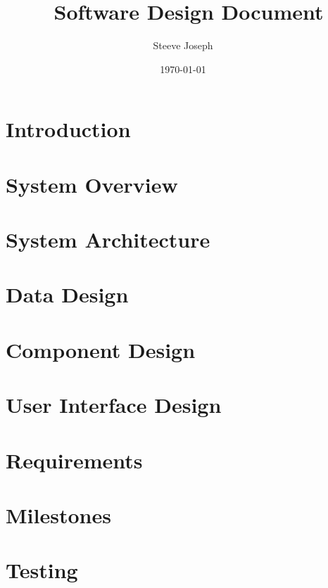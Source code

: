 \documentclass[twoside]{report}
\title{\serviceName\ Software Design Document}
\author{Steeve Joseph}
\date{\today}
\begin{document}
\maketitle
\tableofcontents
\listoffigures
\listoftables


\chapter{Introduction}


\chapter{System Overview}


\chapter{System Architecture}


\chapter{Data Design}


\chapter{Component Design}


\chapter{User Interface Design}


\chapter{Requirements}


\chapter{Milestones}


\chapter{Testing}

\end{document}
